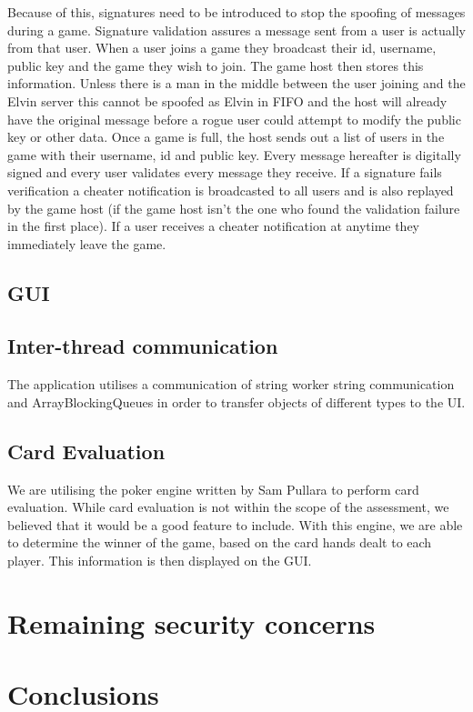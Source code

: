 \documentclass[11pt, oneside]{article}   	%
\begin{document}
Because of this, signatures need to be introduced to stop the spoofing of messages during a game. Signature validation assures a message sent from a user is actually from that user. When a user joins a game they broadcast their id, username, public key and the game they wish to join. The game host then stores this information. Unless there is a man in the middle between the user joining and the Elvin server this cannot be spoofed as Elvin in FIFO and the host will already have the original message before a rogue user could attempt to modify the public key or other data. Once a game is full, the host sends out a list of users in the game with their username, id and public key. Every message hereafter is digitally signed and every user validates every message they receive. If a signature fails verification a cheater notification is broadcasted to all users and is also replayed by the game host (if the game host isn't the one who found the validation failure in the first place). If a user receives a cheater notification at anytime they immediately leave the game.

\subsection{GUI}

\subsection {Inter-thread communication}

The application utilises a communication of string worker string communication and ArrayBlockingQueues in order to transfer objects of different types to the UI.

\subsection{Card Evaluation}

We are utilising the poker engine written by Sam Pullara to perform card evaluation. While card evaluation is not within the scope of the assessment, we believed that it would be a good feature to include. With this engine, we are able to determine the winner of the game, based on the card hands dealt to each player. This information is then displayed on the GUI.

\section{Remaining security concerns}
\label{sec:securityConcerns}

\section{Conclusions}




\end{document}

